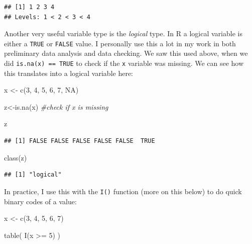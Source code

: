 \documentclass[
]{article}
\newenvironment{Shaded}{\begin{snugshade}}{\end{snugshade}}
\newcommand{\CommentTok}[1]{\textcolor[rgb]{0.56,0.35,0.01}{\textit{#1}}}
\newcommand{\ConstantTok}[1]{\textcolor[rgb]{0.00,0.00,0.00}{#1}}
\newcommand{\DecValTok}[1]{\textcolor[rgb]{0.00,0.00,0.81}{#1}}
\newcommand{\FunctionTok}[1]{\textcolor[rgb]{0.00,0.00,0.00}{#1}}
\newcommand{\NormalTok}[1]{#1}
\newcommand{\OtherTok}[1]{\textcolor[rgb]{0.56,0.35,0.01}{#1}}
\newcommand{\SpecialCharTok}[1]{\textcolor[rgb]{0.00,0.00,0.00}{#1}}
\begin{document}
\begin{verbatim}
## [1] 1 2 3 4
## Levels: 1 < 2 < 3 < 4
\end{verbatim}

Another very useful variable type is the \emph{logical} type. In R a logical
variable is either a \texttt{TRUE} or \texttt{FALSE} value. I personally use this a
lot in my work in both preliminary data analysis and data checking. We
saw this used above, when we did \texttt{is.na(x)\ ==\ TRUE} to check if the \texttt{x}
variable was missing. We can see how this translates into a logical
variable here:

\begin{Shaded}
\begin{Highlighting}[]
\NormalTok{x }\OtherTok{\textless{}{-}} \FunctionTok{c}\NormalTok{(}\DecValTok{3}\NormalTok{, }\DecValTok{4}\NormalTok{, }\DecValTok{5}\NormalTok{, }\DecValTok{6}\NormalTok{, }\DecValTok{7}\NormalTok{, }\ConstantTok{NA}\NormalTok{)}

\NormalTok{z}\OtherTok{\textless{}{-}}\FunctionTok{is.na}\NormalTok{(x) }\CommentTok{\#check if x is missing}

\NormalTok{z}
\end{Highlighting}
\end{Shaded}

\begin{verbatim}
## [1] FALSE FALSE FALSE FALSE FALSE  TRUE
\end{verbatim}

\begin{Shaded}
\begin{Highlighting}[]
\FunctionTok{class}\NormalTok{(z)}
\end{Highlighting}
\end{Shaded}

\begin{verbatim}
## [1] "logical"
\end{verbatim}

In practice, I use this with the \texttt{I()} function (more on this below) to
do quick binary codes of a value:

\begin{Shaded}
\begin{Highlighting}[]
\NormalTok{x }\OtherTok{\textless{}{-}} \FunctionTok{c}\NormalTok{(}\DecValTok{3}\NormalTok{, }\DecValTok{4}\NormalTok{, }\DecValTok{5}\NormalTok{, }\DecValTok{6}\NormalTok{, }\DecValTok{7}\NormalTok{)}

\FunctionTok{table}\NormalTok{( }\FunctionTok{I}\NormalTok{(x }\SpecialCharTok{\textgreater{}=} \DecValTok{5}\NormalTok{) )}
\end{Highlighting}
\end{Shaded}
\end{document}
